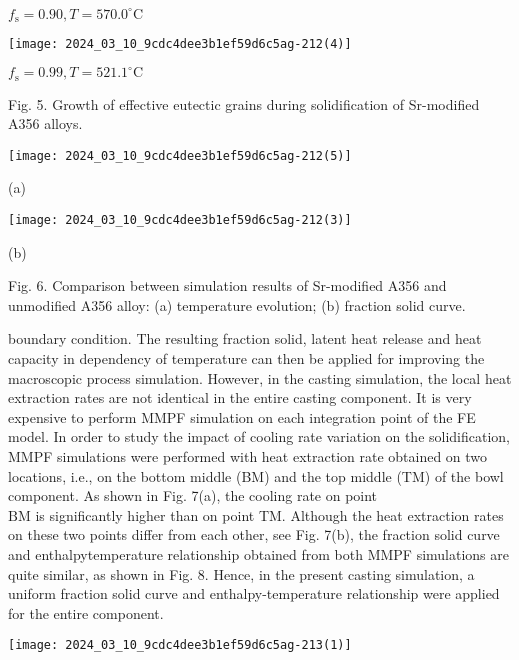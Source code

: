 \documentclass[10pt]{article}
\begin{document}
$f_{\mathrm{s}}=0.90, T=570.0^{\circ} \mathrm{C}$

\begin{center}
\texttt{[image: 2024\_03\_10\_9cdc4dee3b1ef59d6c5ag-212(4)]}
\end{center}

$f_{\mathrm{s}}=0.99, T=521.1^{\circ} \mathrm{C}$

Fig. 5. Growth of effective eutectic grains during solidification of Sr-modified A356 alloys.

\begin{center}
\texttt{[image: 2024\_03\_10\_9cdc4dee3b1ef59d6c5ag-212(5)]}
\end{center}

(a)

\begin{center}
\texttt{[image: 2024\_03\_10\_9cdc4dee3b1ef59d6c5ag-212(3)]}
\end{center}

(b)

Fig. 6. Comparison between simulation results of Sr-modified A356 and unmodified A356 alloy: (a) temperature evolution; (b) fraction solid curve.

boundary condition. The resulting fraction solid, latent heat release and heat capacity in dependency of temperature can then be applied for improving the macroscopic process simulation. However, in the casting simulation, the local heat extraction rates are not identical in the entire casting component. It is very expensive to perform MMPF simulation on each integration point of the FE model. In order to study the impact of cooling rate variation on the solidification, MMPF simulations were performed with heat extraction rate obtained on two locations, i.e., on the bottom middle (BM) and the top middle (TM) of the bowl component. As shown in Fig. 7(a), the cooling rate on point\\
$\mathrm{BM}$ is significantly higher than on point TM. Although the heat extraction rates on these two points differ from each other, see Fig. 7(b), the fraction solid curve and enthalpytemperature relationship obtained from both MMPF simulations are quite similar, as shown in Fig. 8. Hence, in the present casting simulation, a uniform fraction solid curve and enthalpy-temperature relationship were applied for the entire component.

\begin{center}
\texttt{[image: 2024\_03\_10\_9cdc4dee3b1ef59d6c5ag-213(1)]}
\end{center}
\end{document}
